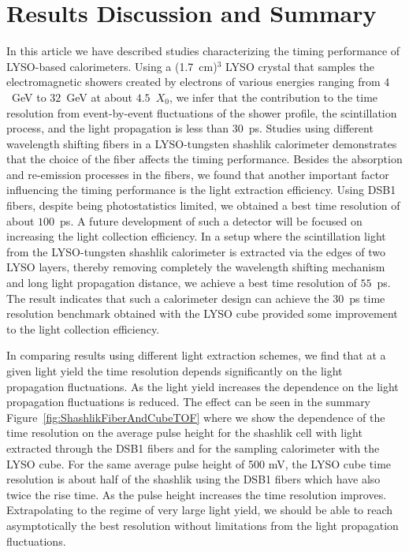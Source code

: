 \documentclass[12pt]{article}
\begin{document}
\section{Results Discussion and Summary }

In this article we have described studies characterizing the timing performance
of LYSO-based calorimeters. Using a (1.7~cm)$^{3}$ LYSO crystal that
samples the electromagnetic showers created by electrons of various energies
ranging from $4$~GeV to $32$~GeV at about $4.5$~$X_{0}$, we infer that the
contribution to the time resolution from event-by-event fluctuations of the
shower profile, the scintillation process, and the light propagation is less than
$30$~ps. Studies using different wavelength shifting fibers in a LYSO-tungsten shashlik calorimeter 
demonstrates that the choice of the fiber affects the timing performance. Besides the absorption 
and re-emission processes in the fibers, we found that another important factor influencing
the timing performance is the light extraction efficiency. Using DSB1 fibers, despite being 
photostatistics limited, we obtained a best time resolution of about $100$~ps.  A future 
development of such a detector will  be focused on increasing the light collection efficiency.
In a setup where  the scintillation light from the LYSO-tungsten
shashlik calorimeter is extracted via the edges of two LYSO layers, thereby
removing completely the wavelength shifting mechanism and long light propagation distance, 
we achieve a best time resolution of $55$~ps. The result  indicates  that such a
calorimeter design can achieve the $30$~ps time resolution benchmark obtained with the LYSO cube
provided some improvement to the light collection efficiency. 

In comparing results using different light extraction schemes, we find that at a
given light yield the time resolution depends significantly on the light
propagation fluctuations. As the light yield increases the dependence on the
light propagation fluctuations is reduced. The effect can be seen in the summary
Figure~\ref{fig:ShashlikFiberAndCubeTOF} where we show the dependence of the
time resolution on the average pulse height for the shashlik cell with light
extracted through the DSB1 fibers and for the sampling calorimeter with the LYSO
cube. For the same average pulse height of 500 mV, the LYSO cube time resolution
is about half of the shashlik using the DSB1 fibers which have also twice the
rise time. As the pulse height increases the time resolution improves.
Extrapolating to the regime of very large light yield, we should be able to
reach asymptotically the best resolution without limitations from the light
propagation fluctuations. 
\end{document}
